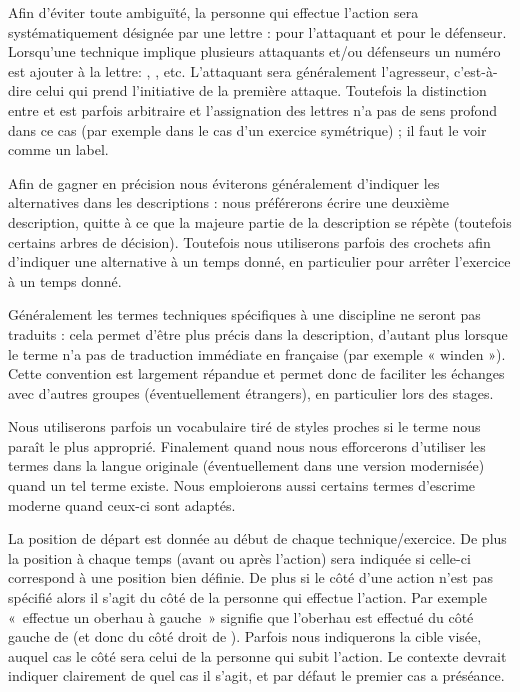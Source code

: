 Afin d'éviter toute ambiguïté, la personne qui effectue l'action sera systématiquement désignée par une lettre : \A pour l'attaquant et \D pour le défenseur.
Lorsqu'une technique implique plusieurs attaquants et/ou défenseurs un numéro est ajouter à la lettre: , , etc.
L'attaquant sera généralement l'agresseur, c'est-à-dire celui qui prend l'initiative de la première attaque.
Toutefois la distinction entre \A et \D est parfois arbitraire et l'assignation des lettres n'a pas de sens profond dans ce cas (par exemple dans le cas d'un exercice symétrique) ; il faut le voir comme un label.

Afin de gagner en précision nous éviterons généralement d'indiquer les alternatives dans les descriptions : nous préférerons écrire une deuxième description, quitte à ce que la majeure partie de la description se répète (toutefois certains arbres de décision).
Toutefois nous utiliserons parfois des crochets afin d'indiquer une alternative à un temps donné, en particulier pour arrêter l'exercice à un temps donné.

Généralement les termes techniques spécifiques à une discipline ne seront pas traduits : cela permet d'être plus précis dans la description, d'autant plus lorsque le terme n'a pas de traduction immédiate en française (par exemple « winden »).
Cette convention est largement répandue et permet donc de faciliter les échanges avec d'autres groupes (éventuellement étrangers), en particulier lors des stages.

Nous utiliserons parfois un vocabulaire tiré de styles proches si le terme nous paraît le plus approprié.
Finalement quand nous nous efforcerons d'utiliser les termes dans la langue originale (éventuellement dans une version modernisée) quand un tel terme existe.
Nous emploierons aussi certains termes d'escrime moderne quand ceux-ci sont adaptés.

La position de départ est donnée au début de chaque technique/exercice.
De plus la position à chaque temps (avant ou après l'action) sera indiquée si celle-ci correspond à une position bien définie.
De plus si le côté d'une action n'est pas spécifié alors il s'agit du côté de la personne qui effectue l'action.
Par exemple « \A effectue un oberhau à gauche » signifie que l'oberhau est effectué du côté gauche de \A (et donc du côté droit de \D).
Parfois nous indiquerons la cible visée, auquel cas le côté sera celui de la personne qui subit l'action.
Le contexte devrait indiquer clairement de quel cas il s'agit, et par défaut le premier cas a préséance.

% 
